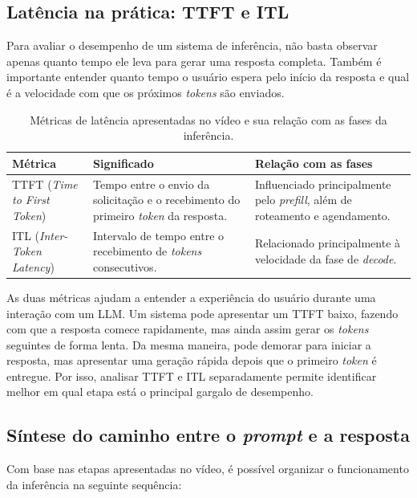 \documentclass[12pt, a4paper]{article}
\begin{document}
\subsection{Latência na prática: TTFT e ITL}

Para avaliar o desempenho de um sistema de inferência, não basta observar apenas quanto tempo ele leva para gerar uma resposta completa. Também é importante entender quanto tempo o usuário espera pelo início da resposta e qual é a velocidade com que os próximos \textit{tokens} são enviados.

\begin{table}[H]
  \centering
  \small
  \caption{Métricas de latência apresentadas no vídeo e sua relação com as fases da inferência.}
  \label{tab:ttft_itl}
  \begin{tabular}{@{}p{2.8cm}p{5.6cm}p{5.2cm}@{}}
    \toprule
    \textbf{Métrica} & \textbf{Significado} & \textbf{Relação com as fases} \\
    \midrule
    TTFT (\textit{Time to First Token}) & Tempo entre o envio da so\-li\-ci\-ta\-ção e o recebimento do primeiro \textit{token} da resposta. & Influenciado principalmente pelo \textit{prefill}, além de roteamento e agendamento. \\
    ITL (\textit{Inter-Token Latency}) & Intervalo de tempo entre o recebimento de \textit{tokens} consecutivos. & Relacionado principalmente à velocidade da fase de \textit{decode}. \\
    \bottomrule
  \end{tabular}
\end{table}

As duas métricas ajudam a entender a experiência do usuário durante uma interação com um LLM. Um sistema pode apresentar um TTFT baixo, fazendo com que a resposta comece rapidamente, mas ainda assim gerar os \textit{tokens} seguintes de forma lenta. Da mesma maneira, pode demorar para iniciar a resposta, mas apresentar uma geração rápida depois que o primeiro \textit{token} é entregue. Por isso, analisar TTFT e ITL separadamente permite identificar melhor em qual etapa está o principal gargalo de desempenho.

\subsection{Síntese do caminho entre o \textit{prompt} e a resposta}

Com base nas etapas apresentadas no vídeo, é possível organizar o funcionamento da inferência na seguinte sequência:
\end{document}
